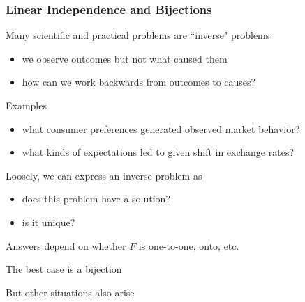 \begin{frame}
    
    \frametitle{Linear Independence and Bijections}

    \vspace{.7em}
    Many scientific and practical problems are ``inverse" problems

    \begin{itemize}
        \item we observe outcomes but not what caused them
        \item how can we work backwards from outcomes to causes?
    \end{itemize}
    
    Examples

    \begin{itemize}
        \item what consumer preferences generated observed market behavior?
        \item what kinds of expectations led to given shift in exchange rates?
    \end{itemize}

\end{frame}

\begin{frame}
    
    \vspace{2em}
    Loosely, we can express an inverse problem as
    
    \begin{figure}
       \begin{center}
        \scalebox{.5}{}
       \end{center}
    \end{figure}

    \begin{itemize}
        \item does this problem have a solution?
        \item is it unique?
    \end{itemize}

    Answers depend on whether $F$ is one-to-one, onto, etc.

    The best case is a bijection

    But other situations also arise

\end{frame}

